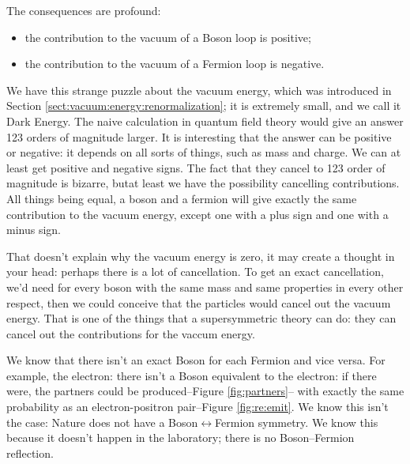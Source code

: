 \documentclass[]{article}
\begin{document}
The consequences are profound:
\begin{itemize}
	\item the contribution to the vacuum of a Boson loop is positive;
	\item the contribution to the vacuum of a Fermion loop is negative.
\end{itemize}
We have this strange puzzle about the vacuum energy, which was introduced in Section \ref{sect:vacuum:energy:renormalization}; it is extremely small, and we call it Dark Energy. The naive calculation in quantum field theory would give an answer 123 orders of magnitude larger. It is interesting that the answer can be positive or negative: it depends on all sorts of things, such as mass and charge. We can at least get positive and negative signs. The fact that they cancel to 123 order of magnitude is bizarre, butat least we have the possibility cancelling contributions. All things being equal, a boson and a fermion will give exactly the same contribution to the vacuum energy, except one with a plus sign and one with a minus sign.

That doesn't explain why the vacuum energy is zero, it may create a thought in your head: perhaps there is a lot of cancellation. To get an exact cancellation, we'd need for every boson with the same mass and same properties in every other respect, then we could conceive that the particles would cancel out the vacuum energy. That is one of the things that a supersymmetric theory can do: they can cancel out the contributions for the vaccum energy.

We know that there isn't an exact Boson for each Fermion and vice versa. For example, the electron: there isn't a Boson equivalent to the electron: if there were, the partners could be produced--Figure \ref{fig:partners}-- with exactly the same probability as an electron-positron pair--Figure \ref{fig:re:emit}. We know this isn't the case: Nature does not have a Boson$\leftrightarrow$Fermion symmetry. We know this because it doesn't happen in the laboratory; there is no Boson--Fermion reflection.  
\end{document}

